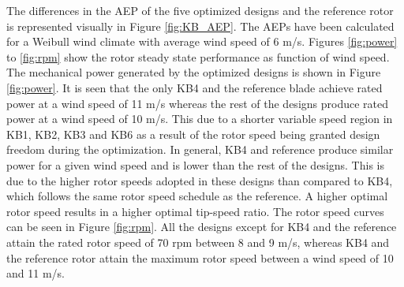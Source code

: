 \begin{table}[!ht]
\centering
\caption{Summary of overall properties of the five optimized blades.}
\label{tab:overall_summary}
\end{table}
The differences in the AEP of the five optimized designs and the reference rotor is represented visually in Figure \ref{fig:KB_AEP}. The AEPs have been calculated for a Weibull wind climate with average wind speed of 6 m/s.
Figures \ref{fig:power} to \ref{fig:rpm} show the rotor steady state performance as function of wind speed. The mechanical power generated by the optimized designs is shown in Figure \ref{fig:power}. It is seen that the only KB4 and the reference blade achieve rated power at a wind speed of 11 m/s whereas the rest of the designs produce rated power at a wind speed of 10 m/s. This due to a shorter variable speed region in KB1, KB2, KB3 and KB6 as a result of the rotor speed being granted design freedom during the optimization. In general, KB4 and reference produce similar power for a given wind speed and is lower than the rest of the designs. This is due to the higher rotor speeds adopted in these designs than compared to KB4, which follows the same rotor speed schedule as the reference. A higher optimal rotor speed results in a higher optimal tip-speed ratio. The rotor speed curves can be seen in Figure \ref{fig:rpm}. All the designs except for KB4 and the reference attain the rated rotor speed of 70 rpm between 8 and 9 m/s, whereas KB4 and the reference rotor attain the maximum rotor speed between a wind speed of 10 and 11 m/s. 

